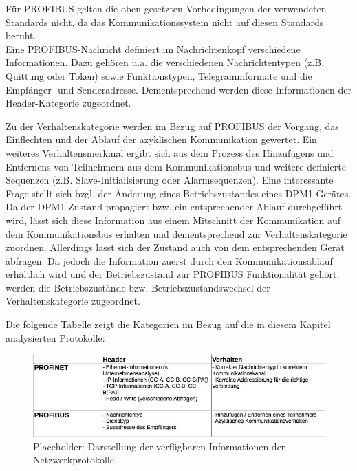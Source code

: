 
Für PROFIBUS gelten die oben gesetzten Vorbedingungen der verwendeten Standards nicht, da das Kommunikationssystem nicht auf diesen Standards beruht.\\

Eine PROFIBUS-Nachricht definiert im Nachrichtenkopf verschiedene Informationen. Dazu gehören u.a. die verschiedenen Nachrichtentypen (z.B. Quittung oder Token) sowie Funktionstypen, Telegrammformate und die Empfänger- und Senderadresse. Dementsprechend werden diese Informationen der Header-Kategorie zugeordnet.  

Zu der Verhaltenskategorie werden im Bezug auf PROFIBUS der Vorgang, das Einflechten und der Ablauf der azyklischen Kommunikation gewertet. Ein weiteres Verhaltensmerkmal ergibt sich aus dem Prozess des Hinzufügens und Entfernens von Teilnehmern aus dem Kommunikationsbus und weitere definierte Sequenzen (z.B. Slave-Initialisierung oder Alarmsequenzen). Eine interessante Frage stellt sich bzgl. der Änderung eines Betriebszustandes eines DPM1 Gerätes. Da der DPM1 Zustand propagiert bzw. ein entsprechender Ablauf durchgeführt wird, lässt sich diese Information aus einem Mitschnitt der Kommunikation auf dem Kommunikationsbus erhalten und dementsprechend zur Verhaltenskategorie zuordnen. Allerdings lässt sich der Zustand auch von dem entsprechenden Gerät abfragen. Da jedoch die Information zuerst durch den Kommunikationsablauf erhältlich wird und der Betriebszustand zur PROFIBUS Funktionalität gehört, werden die Betriebszustände bzw. Betriebszustandswechsel der Verhaltenskategorie zugeordnet.

Die folgende Tabelle zeigt die Kategorien im Bezug auf die in diesem Kapitel analysierten Protokolle:

\begin{figure}[h]
\centering
\includegraphics[width=125mm]{Zeichnungen/IndustrienetzwerkInformationen.jpg}
\caption{Placeholder: Darstellung der verfügbaren Informationen der Netzwerkprotokolle}
\label{fig:IndustryNetworkInformation}
\end{figure}